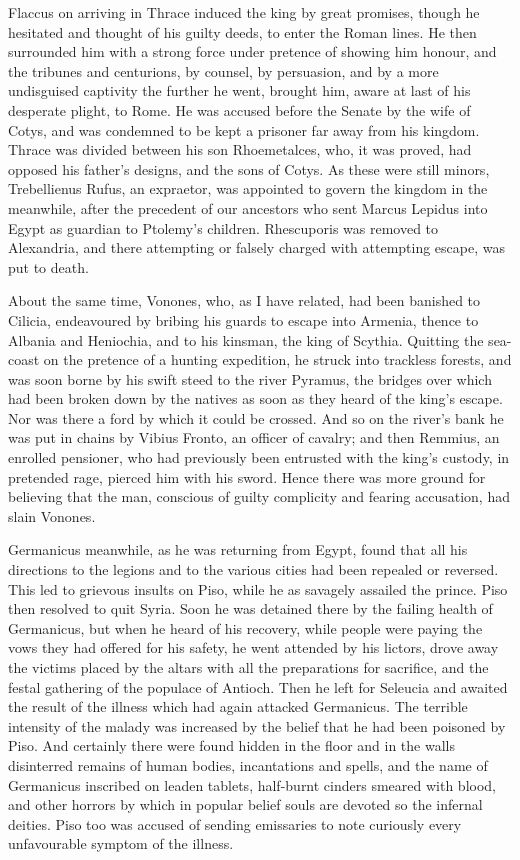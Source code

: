 Flaccus on arriving in Thrace induced the king by great promises, though he hesitated and thought of his guilty deeds, to enter the Roman lines. He then surrounded him with a strong force under pretence of showing him honour, and the tribunes and centurions, by counsel, by persuasion, and by a more undisguised captivity the further he went, brought him, aware at last of his desperate plight, to Rome. He was accused before the Senate by the wife of Cotys, and was condemned to be kept a prisoner far away from his kingdom. Thrace was divided between his son Rhoemetalces, who, it was proved, had opposed his father's designs, and the sons of Cotys. As these were still minors, Trebellienus Rufus, an expraetor, was appointed to govern the kingdom in the meanwhile, after the precedent of our ancestors who sent Marcus Lepidus into Egypt as guardian to Ptolemy's children. Rhescuporis was removed to Alexandria, and there attempting or falsely charged with attempting escape, was put to death.


About the same time, Vonones, who, as I have related, had been banished to Cilicia, endeavoured by bribing his guards to escape into Armenia, thence to Albania and Heniochia, and to his kinsman, the king of Scythia. Quitting the sea-coast on the pretence of a hunting expedition, he struck into trackless forests, and was soon borne by his swift steed to the river Pyramus, the bridges over which had been broken down by the natives as soon as they heard of the king's escape. Nor was there a ford by which it could be crossed. And so on the river's bank he was put in chains by Vibius Fronto, an officer of cavalry; and then Remmius, an enrolled pensioner, who had previously been entrusted with the king's custody, in pretended rage, pierced him with his sword. Hence there was more ground for believing that the man, conscious of guilty complicity and fearing accusation, had slain Vonones.


Germanicus meanwhile, as he was returning from Egypt, found that all his directions to the legions and to the various cities had been repealed or reversed. This led to grievous insults on Piso, while he as savagely assailed the prince. Piso then resolved to quit Syria. Soon he was detained there by the failing health of Germanicus, but when he heard of his recovery, while people were paying the vows they had offered for his safety, he went attended by his lictors, drove away the victims placed by the altars with all the preparations for sacrifice, and the festal gathering of the populace of Antioch. Then he left for Seleucia and awaited the result of the illness which had again attacked Germanicus. The terrible intensity of the malady was increased by the belief that he had been poisoned by Piso. And certainly there were found hidden in the floor and in the walls disinterred remains of human bodies, incantations and spells, and the name of Germanicus inscribed on leaden tablets, half-burnt cinders smeared with blood, and other horrors by which in popular belief souls are devoted so the infernal deities. Piso too was accused of sending emissaries to note curiously every unfavourable symptom of the illness.

